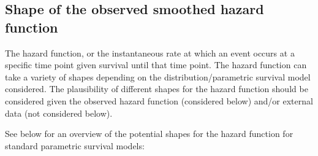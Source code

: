 \documentclass[]{article}
\begin{document}
\subsection{Shape of the observed smoothed hazard
function}\label{shape-of-the-observed-smoothed-hazard-function}

The hazard function, or the instantaneous rate at which an event occurs
at a specific time point given survival until that time point. The
hazard function can take a variety of shapes depending on the
distribution/parametric survival model considered. The plausibility of
different shapes for the hazard function should be considered given the
observed hazard function (considered below) and/or external data (not
considered below).

See below for an overview of the potential shapes for the hazard
function for standard parametric survival models:
\end{document}

